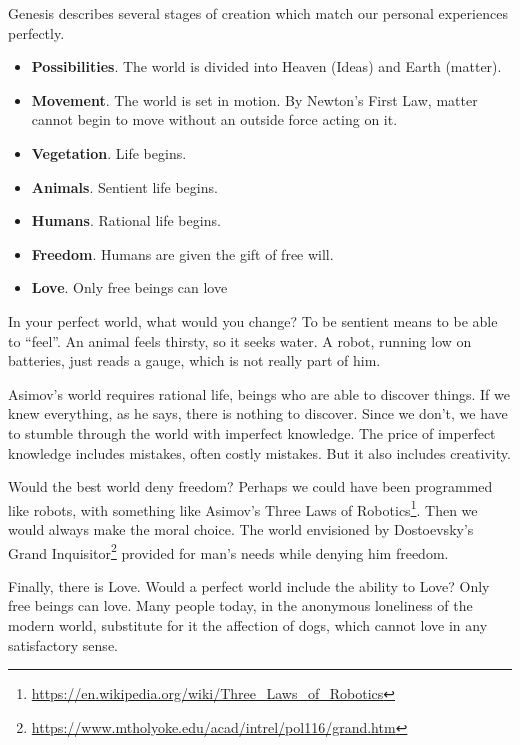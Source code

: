 Genesis describes several stages of creation which match our personal experiences perfectly.

\begin{itemize}


\item \textbf{Possibilities}. The world is divided into Heaven (Ideas) and Earth (matter).

\item \textbf{Movement}. The world is set in motion. By Newton's First Law, matter cannot begin to move without an outside force acting on it.

\item \textbf{Vegetation}. Life begins.


\item \textbf{Animals}. Sentient life begins.


\item \textbf{Humans}. Rational life begins.


\item \textbf{Freedom}. Humans are given the gift of free will.


\item \textbf{Love}. Only free beings can love

\end{itemize}


In your perfect world, what would you change? To be sentient means to be able to ``feel''. An animal feels thirsty, so it seeks water. A robot, running low on batteries, just reads a gauge, which is not really part of him.

Asimov's world requires rational life, beings who are able to discover things. If we knew everything, as he says, there is nothing to discover. Since we don't, we have to stumble through the world with imperfect knowledge. The price of imperfect knowledge includes mistakes, often costly mistakes. But it also includes creativity.

Would the best world deny freedom? Perhaps we could have been programmed like robots, with something like Asimov's Three Laws of Robotics\footnote{\url{https://en.wikipedia.org/wiki/Three\_Laws\_of\_Robotics}}. Then we would always make the moral choice. The world envisioned by Dostoevsky's Grand Inquisitor\footnote{\url{https://www.mtholyoke.edu/acad/intrel/pol116/grand.htm}} provided for man's needs while denying him freedom.

Finally, there is Love. Would a perfect world include the ability to Love? Only free beings can love. Many people today, in the anonymous loneliness of the modern world, substitute for it the affection of dogs, which cannot love in any satisfactory sense.

